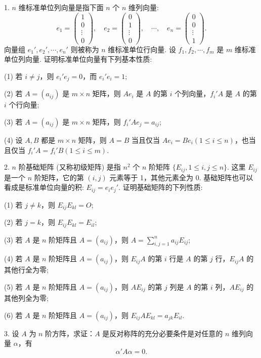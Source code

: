 \documentclass[UTF8, 12pt, fontset=fandol, oneside]{ctexart}
\begin{document}
1. $n$ 维标准单位列向量是指下面 $n$ 个 $n$ 维列向量:
\[
e_1=\left(\begin{array}{c}1\\0\\ \vdots\\0\end{array}\right),\quad
e_2=\left(\begin{array}{c}0\\1\\ \vdots\\0\end{array}\right),\quad \cdots,\quad
e_n=\left(\begin{array}{c}0\\0\\ \vdots\\1\end{array}\right).
\]
向量组 $e_1',e_2',\cdots,e_n'$ 则被称为 $n$ 维标准单位行向量. 设 $f_1,f_2,\cdots,f_m$ 是 $m$ 维标准单位列向量. 证明标准单位向量有下列基本性质:

(1) 若 $i\neq j$，则 $e_i'e_j=0$，而 $e_i'e_i=1$;

(2) 若 $A=(a_{ij})$ 是 $m\times n$ 矩阵，则 $Ae_i$ 是 $A$ 的第 $i$ 个列向量，$f_i'A$ 是 $A$ 的第 $i$ 个行向量;

(3) 若 $A=(a_{ij})$ 是 $m\times n$ 矩阵，则 $f_i'Ae_j=a_{ij}$;

(4) 设 $A,B$ 都是 $m\times n$ 矩阵，则 $A=B$ 当且仅当 $Ae_i=Be_i(1\leq i\leq n)$，也当且仅当 $f_i'A=f_i'B(1\leq i\leq m)$.

2. $n$ 阶基础矩阵 (又称初级矩阵) 是指 $n^2$ 个 $n$ 阶矩阵 $\{E_{ij},1\leq i,j\leq n\}$. 这里 $E_{ij}$ 是一个 $n$ 阶矩阵，它的第 $(i,j)$ 元素等于 1，其他元素全为 0. 基础矩阵也可以看成是标准单位向量的积: $E_{ij}=e_ie_j'$. 证明基础矩阵的下列性质:

(1) 若 $j\neq k$，则 $E_{ij}E_{kl}=O$;

(2) 若 $j=k$，则 $E_{ij}E_{kl}=E_{il}$;

(3) 若 $A$ 是 $n$ 阶矩阵且 $A=(a_{ij})$，则 $A=\sum\limits_{i,j=1}^n a_{ij}E_{ij}$;

(4) 若 $A$ 是 $n$ 阶矩阵且 $A=(a_{ij})$，则 $E_{ij}A$ 的第 $i$ 行是 $A$ 的第 $j$ 行，$E_{ij}A$ 的其他行全为零;

(5) 若 $A$ 是 $n$ 阶矩阵且 $A=(a_{ij})$，则 $AE_{ij}$ 的第 $j$ 列是 $A$ 的第 $i$ 列，$AE_{ij}$ 的其他列全为零;

(6) 若 $A$ 是 $n$ 阶矩阵且 $A=(a_{ij})$，则 $E_{ij}AE_{kl}=a_{jk}E_{il}$.

3. 设 $A$ 为 $n$ 阶方阵，求证：$A$ 是反对称阵的充分必要条件是对任意的 $n$ 维列向量 $\alpha$，有
\[
\alpha'A\alpha=0.
\]
\end{document}
